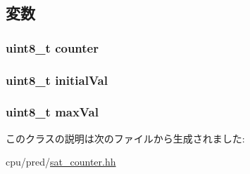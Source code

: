 \subsection{変数}
\hypertarget{classSatCounter_a0480b812cba9c1d9c71a5fb1071bd0fc}{
\subsubsection[{counter}]{\setlength{\rightskip}{0pt plus 5cm}uint8\_\-t {\bf counter}}}
\label{classSatCounter_a0480b812cba9c1d9c71a5fb1071bd0fc}
\hypertarget{classSatCounter_ae248c87ae614be914debb1d07e329ad7}{
\subsubsection[{initialVal}]{\setlength{\rightskip}{0pt plus 5cm}uint8\_\-t {\bf initialVal}}}
\label{classSatCounter_ae248c87ae614be914debb1d07e329ad7}
\hypertarget{classSatCounter_a31d556ff4884898b803cca93ab0e4561}{
\subsubsection[{maxVal}]{\setlength{\rightskip}{0pt plus 5cm}uint8\_\-t {\bf maxVal}}}
\label{classSatCounter_a31d556ff4884898b803cca93ab0e4561}


このクラスの説明は次のファイルから生成されました:\begin{DoxyCompactItemize}
\item 
cpu/pred/\hyperlink{sat__counter_8hh}{sat\_\-counter.hh}\end{DoxyCompactItemize}

